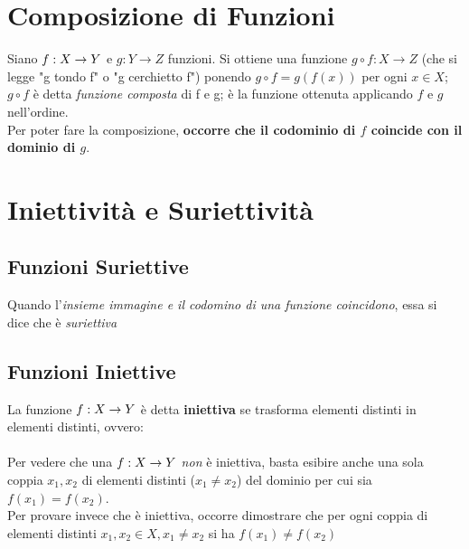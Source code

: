 \documentclass[12pt, a4paper, openany]{book}
\begin{document}
\section{Composizione di Funzioni}
Siano $f: X \rightarrow Y$ e $g: Y \rightarrow Z$ funzioni.
Si ottiene una funzione $g \circ f : X \rightarrow Z $ (che si legge "g tondo f" o "g cerchietto f") ponendo $g \circ f = g(f(x))$ per ogni $x \in X$;
$g \circ f$ è detta \emph{funzione composta} di f e g; è la funzione ottenuta applicando $f$ e $g$ nell'ordine.
\\Per poter fare la composizione, \textbf{occorre che il codominio di $f$ coincide con il dominio di $g$}.


\section{Iniettività e Suriettività}

\subsection*{Funzioni Suriettive}
Quando l'\emph{insieme immagine e il codomino di una funzione coincidono}, essa si dice che è \emph{suriettiva}

\subsection*{Funzioni Iniettive}
La funzione $f: X \rightarrow Y$ è detta \textbf{iniettiva} se trasforma elementi distinti in elementi distinti, ovvero:
\paragraph{}Per vedere che una $f: X \rightarrow Y$ \emph{non} è iniettiva, basta esibire anche una sola coppia $x_1, x_2$ di elementi distinti ($x_1 \neq x_2$) del dominio per cui sia $f(x_1) = f(x_2)$.
\\Per provare invece che è iniettiva, occorre dimostrare che per ogni coppia di elementi distinti $x_1, x_2 \in X, x_1 \neq x_2$ si ha $f(x_1) \neq f(x_2)$
\end{document}
